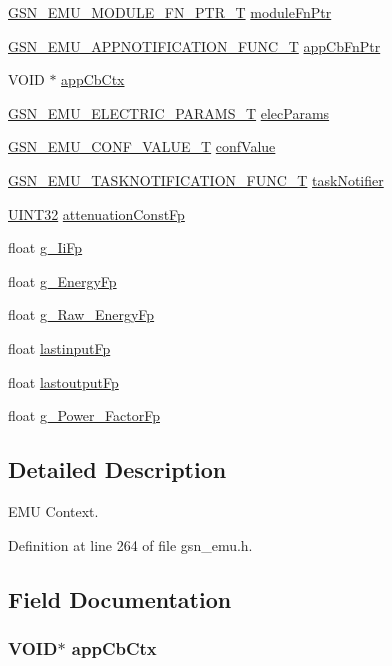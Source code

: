 \begin{DoxyCompactItemize}
\begin{tabbing}
\end{tabbing}\item 
\hyperlink{a00061}{GSN\_\-EMU\_\-MODULE\_\-FN\_\-PTR\_\-T} \hyperlink{a00059_a12640fd70a84f1a68ebb56a244c86722}{moduleFnPtr}
\item 
\hyperlink{a00489_ab0fa7e48e947d0a8dd37314d7aee6ba7}{GSN\_\-EMU\_\-APPNOTIFICATION\_\-FUNC\_\-T} \hyperlink{a00059_a8a951fbafe874586d5d1a95ac1bda95e}{appCbFnPtr}
\item 
VOID $\ast$ \hyperlink{a00059_a42247110483322db37439434ae8e03cc}{appCbCtx}
\item 
\hyperlink{a00060}{GSN\_\-EMU\_\-ELECTRIC\_\-PARAMS\_\-T} \hyperlink{a00059_ad4623a728b040b714e8b17d138d2e774}{elecParams}
\item 
\hyperlink{a00058}{GSN\_\-EMU\_\-CONF\_\-VALUE\_\-T} \hyperlink{a00059_a836176d32d447038bb88414b377b0695}{confValue}
\item 
\hyperlink{a00490_a05b3306759ea16994bc2d9055424367e}{GSN\_\-EMU\_\-TASKNOTIFICATION\_\-FUNC\_\-T} \hyperlink{a00059_a36ee45c72f5016b9cadd6800fe182bb8}{taskNotifier}
\item 
\hyperlink{a00660_gae1e6edbbc26d6fbc71a90190d0266018}{UINT32} \hyperlink{a00059_aa8c6b643ee8938831977aa4738b52955}{attenuationConstFp}
\item 
float \hyperlink{a00059_adcad7e1a1f80df210c106db80efce24c}{g\_\-IiFp}
\item 
float \hyperlink{a00059_a6fd1e0e5fd1f3b6d85711578d367360f}{g\_\-EnergyFp}
\item 
float \hyperlink{a00059_abaff361f11436fef9186f8372635f88f}{g\_\-Raw\_\-EnergyFp}
\item 
float \hyperlink{a00059_a1c6c6aff6522961bb66f41aa1c81a675}{lastinputFp}
\item 
float \hyperlink{a00059_a69a4982d994b218ddb7ed81c02dfc28b}{lastoutputFp}
\item 
float \hyperlink{a00059_a74170e1238d96263904d2c5e2b638994}{g\_\-Power\_\-FactorFp}
\end{DoxyCompactItemize}


\subsection{Detailed Description}
EMU Context. 

Definition at line 264 of file gsn\_\-emu.h.



\subsection{Field Documentation}
\hypertarget{a00059_a42247110483322db37439434ae8e03cc}{
\subsubsection[{appCbCtx}]{\setlength{\rightskip}{0pt plus 5cm}VOID$\ast$ {\bf appCbCtx}}}
\label{a00059_a42247110483322db37439434ae8e03cc}


